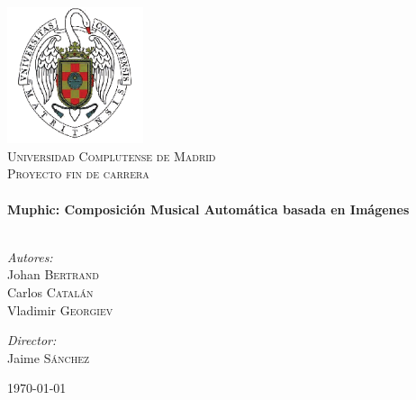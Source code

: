
\begin{titlepage}
\thispagestyle{empty}

\begin{center}


\includegraphics[width=0.3\textwidth]{./graphics/escudo-ucm.png}\\[1cm]    

\textsc{\LARGE Universidad Complutense de Madrid}\\[1.5cm]

\textsc{\Large Proyecto fin de carrera}\\[0.5cm]


\HRule \\[0.4cm]
{ \huge \bfseries Muphic: Composición Musical Automática basada en Imágenes}\\[0.4cm]

\HRule \\[1.5cm]

\begin{minipage}{0.4\textwidth}
\begin{flushleft} \large
\emph{Autores:}\\
Johan \textsc{Bertrand}\\
Carlos \textsc{Catalán}\\
Vladimir \textsc{Georgiev}
\end{flushleft}
\end{minipage}
\begin{minipage}{0.4\textwidth}
\begin{flushright} \large
\emph{Director:} \\
Jaime \textsc{Sánchez}
\end{flushright}
\end{minipage}

\vfill

{\large \today}

\end{center}

\end{titlepage}
